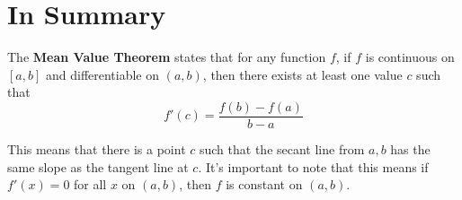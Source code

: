 \documentclass{ximera}
\begin{document}
\section{In Summary}

\begin{definition}
The \textbf{Mean Value Theorem} states that for any function $f$, if $f$ is continuous on $[a,b]$ and differentiable on $(a,b)$, then there exists at least one value $c$ such that $$f'(c)=\frac{f(b)-f(a)}{b-a}$$

This means that there is a point $c$ such that the secant line from $a, b$ has the same slope as the tangent line at $c$. It's important to note that this means if $f'(x)=0$ for all $x$ on $(a,b)$, then $f$ is constant on $(a,b)$.
\end{definition}
\end{document}
